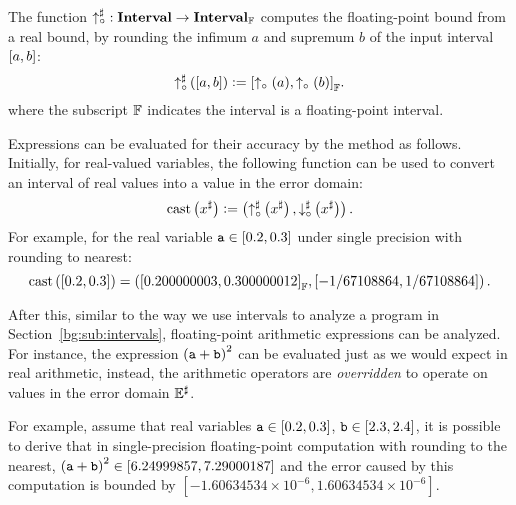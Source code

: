 The function $\operatorname{\uparrow^\sharp_\circ}: \mathbf{Interval} \to \mathbf{Interval}_\mathbb{F}$ computes the
floating-point bound from a real bound, by rounding the infimum $a$ and
supremum $b$ of the input interval $\left[{a}, {b}\right]$:
\begin{equation}
    \operatorname{\uparrow^\sharp_\circ}\left(\left[a, b\right]\right)
    \vcentcolon= {\left[
        \uparrow_\circ{\left(a\right)},
        \uparrow_\circ{\left(b\right)}
    \right]}_\mathbb{F}.
\end{equation}
where the subscript $\mathbb{F}$ indicates the interval is a floating-point
interval.

Expressions can be evaluated for their accuracy by the method as follows.
Initially, for real-valued variables, the following function can be used to
convert an interval of real values into a value in the error domain:
\begin{equation}
    \mathrm{cast}\left(x^\sharp\right) \vcentcolon= \left(
        \operatorname{\uparrow^\sharp_\circ}\left(x^\sharp\right), \operatorname{\downarrow^\sharp_\circ}\left(x^\sharp\right)
    \right).
    \label{bg:eq:cast}
\end{equation}
For example, for the real variable $\texttt{a} \in [0.2, 0.3]$ under single
precision with rounding to nearest:
\begin{equation}
    \mathrm{cast}\left([0.2, 0.3]\right) = \left(
        {\left[0.200000003, 0.300000012\right]}_\mathbb{F},
        \left[-1/67108864, 1/67108864\right]
    \right).
\end{equation}

After this, similar to the way we use intervals to analyze a program in
Section~\ref{bg:sub:intervals}, floating-point arithmetic expressions can be
analyzed.  For instance, the expression ${(\texttt{a} + \texttt{b})}^2$ can be evaluated
just as we would expect in real arithmetic, instead, the arithmetic operators
are \emph{overridden} to operate on values in the error domain $\mathbb{E}^\sharp$.

For example, assume that real variables $\texttt{a} \in [0.2, 0.3]$, $\texttt{b} \in
[2.3, 2.4]$, it is possible to derive that in single-precision floating-point
computation with rounding to the nearest, ${(\texttt{a} + \texttt{b})}^2 \in [6.24999857,
7.29000187]$ and the error caused by this computation is bounded by
$[-1.60634534\times10^{-6}, 1.60634534\times10^{-6}]$.
